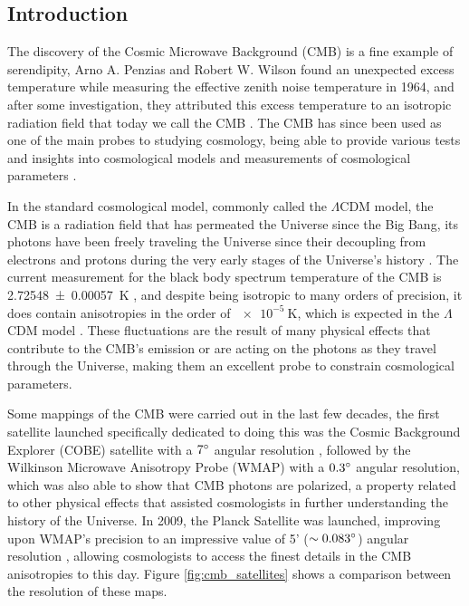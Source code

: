 \documentclass[openany,a4paper,12pt,oneside]{book}
\begin{document}
\cleardoublepage
{}

\begingroup
{}
\begin{spacing}{1.5}
\setlength{\abovedisplayskip}{0.01cm}
\setlength{\abovedisplayshortskip}{0.01cm}

\chapter{Introduction}

The discovery of the Cosmic Microwave Background (CMB) is a fine example of serendipity, Arno A. Penzias and Robert W. Wilson found an unexpected excess temperature while measuring the effective zenith noise temperature in 1964, and after some investigation, they attributed this excess temperature to an isotropic radiation field that today we call the CMB \cite{1965CMB_discovery}. The CMB has since been used as one of the main probes to studying cosmology, being able to provide various tests and insights into cosmological models \cite{Large_scale_anomalies, nongaussianity_inflation, rees_sciama_effect} and measurements of cosmological parameters \cite{WMAP_results, Planck_results}. 

In the standard cosmological model, commonly called the $\Lambda$CDM model, the CMB is a radiation field that has permeated the Universe since the Big Bang, its photons have been freely traveling the Universe since their decoupling from electrons and protons during the very early stages of the Universe's history \cite{CMB_physical_explanation}. The current measurement for the black body spectrum temperature of the CMB is \SI{2.72548 \pm 0.00057}{\kelvin} \cite{CMB_temperature:Fixsen_2009}, and despite being isotropic to many orders of precision, it does contain anisotropies in the order of $\SI{e-5}{\kelvin}$, which is expected in the $\Lambda$CDM model \cite{CMB_analytical_anisotropies}. These fluctuations are the result of many physical effects that contribute to the CMB's emission or are acting on the photons as they travel through the Universe, making them an excellent probe to constrain cosmological parameters.

Some mappings of the CMB were carried out in the last few decades, the first satellite launched specifically dedicated to doing this was the Cosmic Background Explorer (COBE) satellite with a $7\degree$ angular resolution \cite{COBE}, followed by the Wilkinson Microwave Anisotropy Probe (WMAP) with a $0.3\degree$ angular resolution, which was also able to show that CMB photons are polarized, a property related to other physical effects that assisted cosmologists in further understanding the history of the Universe\cite{polarization_1997, polarization_2014, BMode_constraints}. In 2009, the Planck Satellite was launched, improving upon WMAP's precision to an impressive value of 5' ($\sim 0.083\degree$) angular resolution \cite{theplanckcollaboration2006scientific}, allowing cosmologists to access the finest details in the CMB anisotropies to this day. Figure \ref{fig:cmb_satellites} shows a comparison between the resolution of these maps.


\end{spacing}
\end{document}
